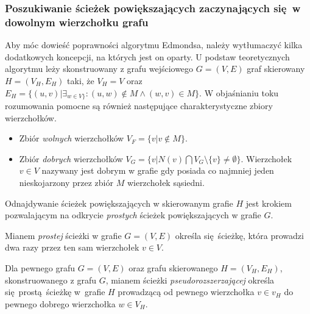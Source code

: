 \subsubsection{\textbf{Poszukiwanie ścieżek powiększających zaczynających się w dowolnym wierzchołku grafu}}
\par{
  Aby móc dowieść poprawności algorytmu Edmondsa, należy wytłumaczyć kilka dodatkowych koncepcji, na których jest on oparty.
  U podstaw teoretycznych algorytmu leży skonstruowany z grafu wejściowego $G=(V, E)$ graf skierowany $H=(V_H, E_H)$ taki, że $V_H=V$ oraz $E_H=\{(u, v)|\exists_{w\in V\}}:(u, w) \notin M \land (w, v) \in M\}$.
  W objaśnianiu toku rozumowania pomocne są również następujące charakterystyczne zbiory wierzchołków.
  \begin{itemize}
    \item Zbiór \emph{wolnych} wierzchołków $V_F=\{v | v \notin M\}$.
    \item Zbiór \emph{dobrych} wierzchołków $V_G=\{v | N(v) \bigcap V_G \setminus \{v\} \neq \emptyset\}$. Wierzchołek $v\in V$ nazywany jest dobrym w grafie gdy posiada co najmniej jeden nieskojarzony przez zbiór $M$ wierzchołek sąsiedni.
  \end{itemize}
  
  Odnajdywanie ścieżek powiększających w skierowanym grafie $H$ jest krokiem pozwalającym na odkrycie \emph{prostych} ścieżek powiększających w grafie $G$.
  \begin{definition}
    Mianem \emph{prostej} ścieżki w grafie $G=(V, E)$ określa się ścieżkę, która prowadzi dwa razy przez ten sam wierzchołek $v \in V$.
  \end{definition}
  \begin{definition}
    Dla pewnego grafu $G=(V, E)$ oraz grafu skierowanego $H=(V_H,E_H)$, skonstruowanego z grafu $G$, mianem ścieżki \emph{pseudorozszerzającej} określa się prostą ścieżkę w~grafie $H$ prowadzącą od pewnego wierzchołka $v \in v_H$ do pewnego dobrego wierzchołka $w \in V_H$.
  \end{definition}

}
